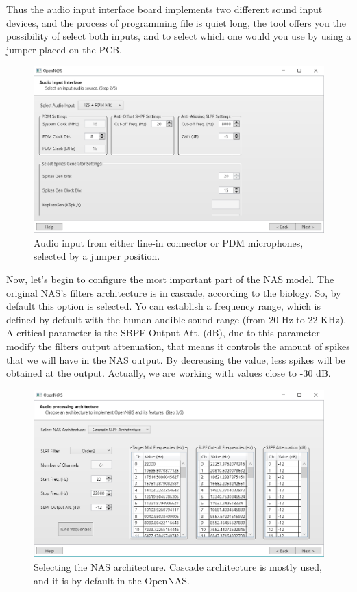 Thus the audio input interface board implements two different sound input devices, and the process of programming file is quiet long, the tool offers you the possibility of select both inputs, and to select which one would you use by using a jumper placed on the PCB.

\begin{figure}[H]
\centering
\includegraphics[width=1\textwidth]{images/Img19_S2_SelectInput_4.PNG}
\caption{\label{fig:OpenNAS_s2_i2s_pdm}Audio input from either line-in connector or PDM microphones, selected by a jumper position.}
\end{figure}

Now, let's begin to configure the most important part of the NAS model. The original NAS's filters architecture is in cascade, according to the biology. So, by default this option is selected. Yo can establish a frequency range, which is defined by default with the human audible sound range (from 20 Hz to 22 KHz). A critical parameter is the SBPF Output Att. (dB), due to this parameter modify the filters output attenuation, that means it controls the amount of spikes that we will have in the NAS output. By decreasing the value, less spikes will be obtained at the output. Actually, we are working with values close to -30 dB. 

\begin{figure}[H]
\centering
\includegraphics[width=1\textwidth]{images/Img20_S3_Arch.PNG}
\caption{\label{fig:OpenNAS_s3_cascade}Selecting the NAS architecture. Cascade architecture is mostly used, and it is by default in the OpenNAS.}
\end{figure}

